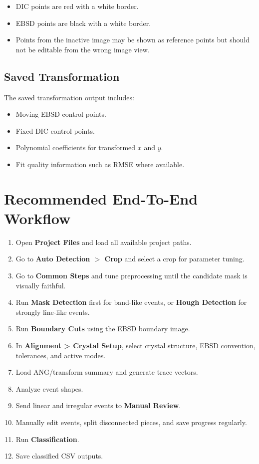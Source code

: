 \documentclass[11pt]{article}
\newcommand{\ui}[1]{\textbf{#1}}
\begin{document}
\begin{itemize}
    \item DIC points are red with a white border.
    \item EBSD points are black with a white border.
    \item Points from the inactive image may be shown as reference points but should not be editable from the wrong image view.
\end{itemize}

\subsection{Saved Transformation}

The saved transformation output includes:

\begin{itemize}
    \item Moving EBSD control points.
    \item Fixed DIC control points.
    \item Polynomial coefficients for transformed \(x\) and \(y\).
    \item Fit quality information such as RMSE where available.
\end{itemize}

\section{Recommended End-To-End Workflow}

\begin{enumerate}
    \item Open \ui{Project Files} and load all available project paths.
    \item Go to \ui{Auto Detection $>$ Crop} and select a crop for parameter tuning.
    \item Go to \ui{Common Steps} and tune preprocessing until the candidate mask is visually faithful.
    \item Run \ui{Mask Detection} first for band-like events, or \ui{Hough Detection} for strongly line-like events.
    \item Run \ui{Boundary Cuts} using the EBSD boundary image.
    \item In \ui{Alignment > Crystal Setup}, select crystal structure, EBSD convention, tolerances, and active modes.
    \item Load ANG/transform summary and generate trace vectors.
    \item Analyze event shapes.
    \item Send linear and irregular events to \ui{Manual Review}.
    \item Manually edit events, split disconnected pieces, and save progress regularly.
    \item Run \ui{Classification}.
    \item Save classified CSV outputs.
\end{enumerate}
\end{document}
